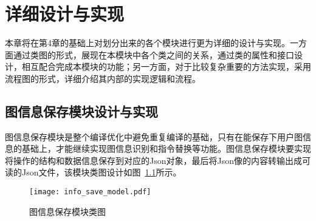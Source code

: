 
\chapter{详细设计与实现}

本章将在第4章的基础上对划分出来的各个模块进行更为详细的设计与实现。一方面通过类图的形式，展现在本模块中各个类之间的关系，通过类的属性和接口设计，相互配合完成本模块的功能；另一方面，对于比较复杂重要的方法实现，采用流程图的形式，详细介绍其内部的实现逻辑和流程。

\section{图信息保存模块设计与实现}

图信息保存模块是整个编译优化中避免重复编译的基础，只有在能保存下用户图信息的基础上，才能继续实现图信息识别和指令替换等功能。图信息保存模块要实现将操作的结构和数据信息保存到对应的Json对象，最后将Json像的内容转输出成可读的Json文件，该模块类图设计如图~\ref{fig:info-save-model}所示。

\begin{figure}[htb]
  \centering
  \texttt{[image: info\_save\_model.pdf]}
  \caption{图信息保存模块类图}
  \label{fig:info-save-model}
\end{figure}

